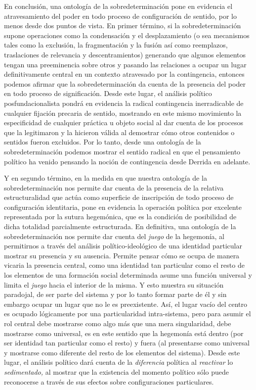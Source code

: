 En conclusión, una ontología de la sobredeterminación pone en evidencia el atravesamiento del poder en todo proceso de configuración de sentido, por lo menos desde dos puntos de vista. En primer término, si la sobredeterminación supone operaciones como la condensación y el desplazamiento (o sea mecanismos tales como la exclusión, la fragmentación y la fusión así como reemplazos, traslaciones de relevancia y descentramientos) generando que algunos elementos tengan una preeminencia sobre otros y pasando las relaciones a ocupar un lugar definitivamente central en un contexto atravesado por la contingencia, entonces podemos afirmar que la sobredeterminación da cuenta de la presencia del poder en todo proceso de significación. Desde este lugar, el análisis político posfundacionalista pondrá en evidencia la radical contingencia inerradicable de cualquier fijación precaria de sentido, mostrando en este mismo movimiento la especificidad de cualquier práctica u objeto social al dar cuenta de los procesos que la legitimaron y la hicieron válida al demostrar cómo otros contenidos o sentidos fueron excluidos. Por lo tanto, desde una ontología de la sobredeterminación podemos mostrar el sentido radical en que el pensamiento político ha venido pensando la noción de contingencia desde Derrida en adelante.

Y en segundo término, en la medida en que nuestra ontología de la sobredeterminación nos permite dar cuenta de la presencia de la relativa estructuralidad que actúa como superficie de inscripción de todo proceso de configuración identitaria, pone en evidencia la operación política por excelente representada por la sutura hegemónica, que es la condición de posibilidad de dicha totalidad parcialmente estructurada. En definitiva, una ontología de la sobredeterminación nos permite dar cuenta del \emph{juego} de la hegemonía, al permitirnos a través del análisis político-ideológico de una identidad particular mostrar su presencia y su ausencia. Permite pensar cómo se ocupa de manera vicaria la presencia central, como una identidad tan particular como el resto de los elementos de una formación social determinada asume una función universal y limita el \emph{juego} hacia el interior de la misma. Y esto muestra su situación paradojal, de ser parte del sistema y por lo tanto formar parte de él y sin embargo ocupar un lugar que no le es preexistente. Así, el lugar vacío del centro es ocupado lógicamente por una particularidad intra-sistema, pero para asumir el rol central debe mostrarse como algo más que una mera singularidad, debe mostrarse como universal, es en este sentido que la hegemonía está dentro (por ser identidad tan particular como el resto) y fuera (al presentarse como universal y mostrarse como diferente del resto de los elementos del sistema). Desde este lugar, el análisis político dará cuenta de la \emph{diferencia} política al \emph{reactivar} lo \emph{sedimentado,} al mostrar que la existencia del momento político sólo puede reconocerse a través de sus efectos sobre configuraciones particulares.

